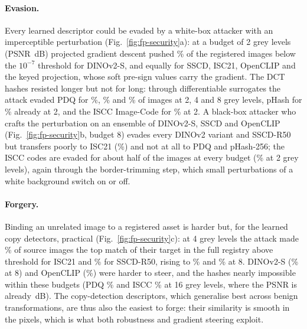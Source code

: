 \paragraph{Evasion.} Every learned descriptor could be evaded by a white-box attacker with an imperceptible perturbation (Fig.~\ref{fig:fp-security}a): at a budget of 2 grey levels (PSNR \,dB) projected gradient descent pushed \% of the registered images below the $10^{-7}$ threshold for DINOv2-S, and equally for SSCD, ISC21, OpenCLIP and the keyed projection, whose soft pre-sign values carry the gradient. The DCT hashes resisted longer but not for long: through differentiable surrogates the attack evaded PDQ for \%, \% and \% of images at 2, 4 and 8 grey levels, pHash for \% already at 2, and the ISCC Image-Code for \% at 2. A black-box attacker who crafts the perturbation on an ensemble of DINOv2-S, SSCD and OpenCLIP (Fig.~\ref{fig:fp-security}b, budget 8) evades every DINOv2 variant and SSCD-R50 but transfers poorly to ISC21 (\%) and not at all to PDQ and pHash-256; the ISCC codes are evaded for about half of the images at every budget (\% at 2 grey levels), again through the border-trimming step, which small perturbations of a white background switch on or off.

\paragraph{Forgery.} Binding an unrelated image to a registered asset is harder but, for the learned copy detectors, practical (Fig.~\ref{fig:fp-security}c): at 4 grey levels the attack made \% of source images the top match of their target in the full registry above threshold for ISC21 and \% for SSCD-R50, rising to \% and \% at 8. DINOv2-S (\% at 8) and OpenCLIP (\%) were harder to steer, and the hashes nearly impossible within these budgets (PDQ \% and ISCC \% at 16 grey levels, where the PSNR is already \,dB). The copy-detection descriptors, which generalise best across benign transformations, are thus also the easiest to forge: their similarity is smooth in the pixels, which is what both robustness and gradient steering exploit.

